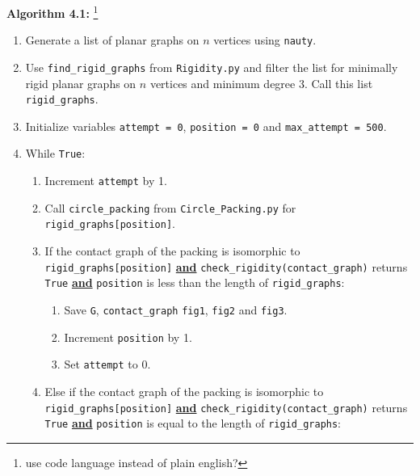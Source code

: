 \begin{flushleft}
\textbf{Algorithm 4.1:} \footnote{use code language instead of plain english?}
\begin{enumerate}
    \item Generate a list of planar graphs on $n$ vertices using \texttt{nauty}.
    \vspace{-3mm}
    \item Use \texttt{find\_rigid\_graphs} from \texttt{Rigidity.py} and filter the list for minimally rigid planar graphs on $n$ vertices and minimum degree 3. Call this list \texttt{rigid\_graphs}.
    \vspace{-3mm}
    \item Initialize variables \texttt{attempt = 0}, \texttt{position = 0} and \texttt{max\_attempt = 500}.
    \vspace{-3mm}
    \item While \texttt{True}:
    \vspace{-3mm}
    \begin{enumerate}
        \item Increment \texttt{attempt} by 1.
        \vspace{-1mm}
        \item Call \texttt{circle\_packing} from \texttt{Circle\_Packing.py} for \texttt{rigid\_graphs[position]}.
        \vspace{-1mm}
        \item If the contact graph of the packing is isomorphic to \texttt{rigid\_graphs[position]} \textbf{\underline{and}} \texttt{check\_rigidity(contact\_graph)} returns \texttt{True} \textbf{\underline{and}} \texttt{position} is less than the length of \texttt{rigid\_graphs}:
        \begin{enumerate}
            \item Save \texttt{G}, \texttt{contact\_graph} \texttt{fig1}, \texttt{fig2} and \texttt{fig3}.
            \vspace{-1mm}
            \item Increment \texttt{position} by 1.
            \vspace{-1mm}
            \item Set \texttt{attempt} to 0.
        \end{enumerate}
        \vspace{-1mm}
        \item Else if the contact graph of the packing is isomorphic to \texttt{rigid\_graphs[position]} \textbf{\underline{and}} \texttt{check\_rigidity(contact\_graph)} returns \texttt{True} \textbf{\underline{and}} \texttt{position} is equal to the length of \texttt{rigid\_graphs}:

\end{enumerate}
\end{enumerate}
\end{flushleft}
